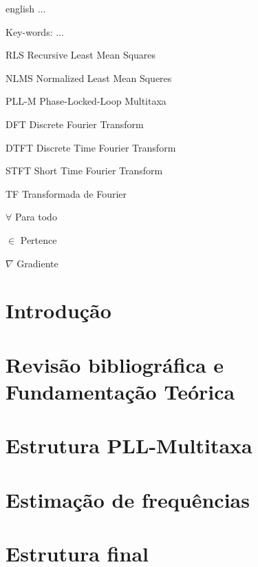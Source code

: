 \documentclass[
12pt,
openany, %
oneside, %
a4paper,			
english,			
brazil			        %
]{abntbibufjf}
\begin{document}
\begin{resumo}[ABSTRACT]
	\begin{otherlanguage*}{english}
		...
		
		Key-words: ...
	\end{otherlanguage*}
\end{resumo}


\listoffigures*
\cleardoublepage


\listoftables*
\cleardoublepage

\begin{siglas} %
	\item[RLS] Recursive Least Mean Squares
	\item[NLMS] Normalized Least Mean Squeres
	\item[PLL-M] Phase-Locked-Loop Multitaxa
	\item[DFT] Discrete Fourier Transform
	\item[DTFT] Discrete Time Fourier Transform
	\item[STFT] Short Time Fourier Transform
	\item[TF] Transformada de Fourier
\end{siglas}

\begin{simbolos} %
	\item[$ \forall $] Para todo
	\item[$ \in $] Pertence
	\item[$ \nabla $] Gradiente
	
\end{simbolos}

\chapter{Introdução}


\chapter{Revisão bibliográfica e Fundamentação Teórica}


\chapter{Estrutura PLL-Multitaxa}


\chapter{Estimação de frequências}


\chapter{Estrutura final}


%

\printbibliography
\end{document}
